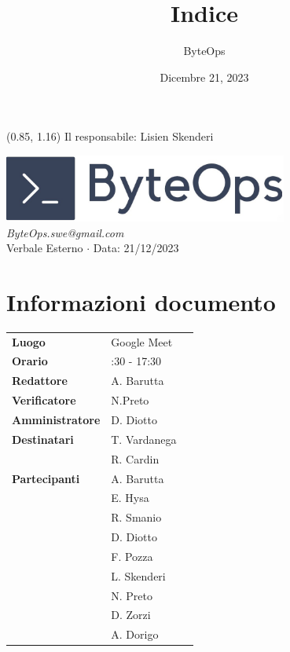 \documentclass{article}
\title{\textbf{\fontsize{28}{6}\selectfont Indice}}
\author{\fontsize{14}{6}\selectfont ByteOps}
\date{Dicembre 21, 2023}
\begin{document}
\begin{textblock*}{\textwidth}(0.85\textwidth, 1.16\textheight)
    Il responsabile: Lisien Skenderi
\end{textblock*}

\pagestyle{fancy}
\begin{center}
\includegraphics[width = 0.7\textwidth]{../../Images/logo.png} \\
\vspace{0.2cm}
\textcolor[RGB]{60, 60, 60}{\textit{ByteOps.swe@gmail.com}} \\
\vspace{1cm}
\fontsize{16}{6}\selectfont Verbale Esterno $\cdot$ Data: 21/12/2023 \\
\vspace{0.5cm}
\end{center}

\section*{Informazioni documento}
\def\arraystretch{1.2}
\begin{tabular}{>{\raggedleft\arraybackslash}p{}|>{\raggedright\arraybackslash}p{}c}
\hline
\addlinespace
\textbf{Luogo} & Google Meet \vspace{10pt} \\
\textbf{Orario} & 16:30 - 17:30 \vspace{10pt} \\
\textbf{Redattore} & A. Barutta \vspace{10pt} \\
\textbf{Verificatore} & N.Preto \vspace{10pt} \\
\textbf{Amministratore} & D. Diotto \vspace{10pt} \\
\textbf{Destinatari} & T. Vardanega \\ & R. Cardin \vspace{10pt} \\
\textbf{Partecipanti} & A. Barutta \\ & E. Hysa \\ & R. Smanio \\ & D. Diotto \\ & F. Pozza \\ & L. Skenderi \\ & N. Preto \\ & D. Zorzi \\ & A. Dorigo \vspace{10pt}
\end{tabular}
\pagebreak 
\end{document}
